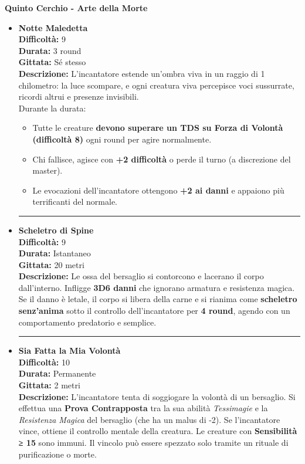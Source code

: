 \documentclass[./magie.tex]{subfiles}
\begin{document}
\clearpage
\vspace{0.2cm}
{\zarafirtitlefont\Large\bfseries Quinto Cerchio - Arte della Morte}

\begin{itemize}

\item \textbf{Notte Maledetta} \\
\textbf{Difficoltà:} 9 \\
\textbf{Durata:} 3 round \\
\textbf{Gittata:} Sé stesso \\
\textbf{Descrizione:} L’incantatore estende un’ombra viva in un raggio di 1 chilometro: la luce scompare, e ogni creatura viva percepisce voci sussurrate, ricordi altrui e presenze invisibili.\\
Durante la durata:
\begin{itemize}
\item Tutte le creature \textbf{devono superare un TDS su Forza di Volontà (difficoltà 8)} ogni round per agire normalmente.
\item Chi fallisce, agisce con \textbf{+2 difficoltà} o perde il turno (a discrezione del master).
\item Le evocazioni dell’incantatore ottengono \textbf{+2 ai danni} e appaiono più terrificanti del normale.
\end{itemize}

\vspace{0.5cm}\rule{\textwidth}{0.4pt}\vspace{1cm}

\item \textbf{Scheletro di Spine} \\
\textbf{Difficoltà:} 9 \\
\textbf{Durata:} Istantaneo \\
\textbf{Gittata:} 20 metri \\
\textbf{Descrizione:} Le ossa del bersaglio si contorcono e lacerano il corpo dall’interno. Infligge \textbf{3D6 danni} che ignorano armatura e resistenza magica. Se il danno è letale, il corpo si libera della carne e si rianima come \textbf{scheletro senz’anima} sotto il controllo dell’incantatore per \textbf{4 round}, agendo con un comportamento predatorio e semplice.


\vspace{0.5cm}\rule{\textwidth}{0.4pt}\vspace{1cm}
\clearpage
\item \textbf{Sia Fatta la Mia Volontà} \\
\textbf{Difficoltà:} 10 \\
\textbf{Durata:} Permanente \\
\textbf{Gittata:} 2 metri \\
\textbf{Descrizione:} L’incantatore tenta di soggiogare la volontà di un bersaglio. Si effettua una \textbf{Prova Contrapposta} tra la sua abilità \emph{Tessimagie} e la \emph{Resistenza Magica} del bersaglio (che ha un malus di -2). Se l’incantatore vince, ottiene il controllo mentale della creatura. Le creature con \textbf{Sensibilità ≥ 15} sono immuni. Il vincolo può essere spezzato solo tramite un rituale di purificazione o morte.


\end{itemize}
\end{document}
